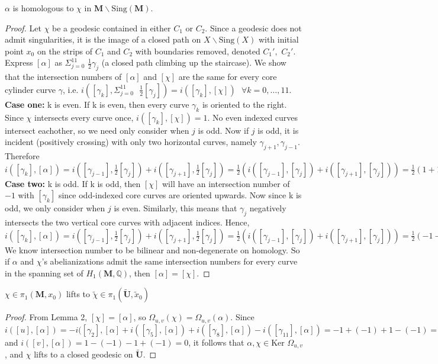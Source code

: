 \documentclass[]{article}
\begin{document}
\begin{lem}
$\alpha$ is homologous to $\chi$ in  $\mathbf{M}\backslash\text{Sing}(\mathbf{M})$.
\begin{proof}
Let $\chi$ be a geodesic contained in either $C_1$ or $C_2$. Since a geodesic does not admit singularities, it is the image of a closed path on $X\backslash\text{Sing}(X)$ with initial point $x_0$ on the strips of $C_1$ and $C_2$ with boundaries removed, denoted $C_1',$ $C_2'$. Express $[\alpha]$ as $\Sigma^{11}_{j=0}$ $\frac{1}{2}\gamma_j$ (a closed path climbing up the staircase). We show that the intersection numbers of $[\alpha]$ and $[\chi]$ are the same for every core cylinder curve $\gamma$, i.e. $i([\gamma_k], \Sigma^{11}_{j=0} \text{ } \frac{1}{2}[\gamma_j])=i([\gamma_k],[\chi])\text{ } \forall k=0,\dots,11$.\\
\textbf{Case one:} k is even. If k is even, then every curve $\gamma_k$ is oriented to the right. Since $\chi$ intersects every curve once, $i([\gamma_k],[\chi])=1$. No even indexed curves intersect eachother, so we need only consider when $j$ is odd. Now if $j$ is odd, it is incident (positively crossing) with only two horizontal curves, namely $\gamma_{j+1},\gamma_{j-1}$. Therefore $i([\gamma_k],[\alpha])=i([\gamma_{j-1}],\frac{1}{2}[\gamma_{j}])+i([\gamma_{j+1}],\frac{1}{2}[\gamma_{j}])=\frac{1}{2}(i([\gamma_{j-1}],[\gamma_{j}])+i([\gamma_{j+1}],[\gamma_{j}]))=\frac{1}{2}(1+1)=1.$\\
\textbf{Case two:} k is odd. If k is odd, then $[\chi]$ will have an intersection number of $-1$ with $[\gamma_k]$ since odd-indexed core curves are oriented upwards. Now since k is odd, we only consider when $j$ is even. Similarly, this means that $\gamma_j$ negatively intersects the two vertical core curves with adjacent indices. Hence, $i([\gamma_k],[\alpha])=i([\gamma_{j-1}],\frac{1}{2}[\gamma_{j}])+i([\gamma_{j+1}],\frac{1}{2}[\gamma_{j}])=\frac{1}{2}(i([\gamma_{j-1}],[\gamma_{j}])+i([\gamma_{j+1}],[\gamma_{j}]))=\frac{1}{2}(-1-1)=-1.$\\
We know intersection number to be bilinear and non-degenerate on homology. So if $\alpha$ and $\chi$'s abelianizations admit the same intersection numbers for every curve in the spanning set of $H_1(\mathbf{M}, \mathbb{Q})$, then $[\alpha]=[\chi]$.
\end{proof}
\end{lem}

\begin{thm}
$\chi\in\pi_1(\mathbf{M},x_0)$ lifts to $\tilde{\chi}\in\pi_1(\tilde{\mathbf{U}},\tilde{x}_0)$
\begin{proof}
From Lemma 2, $[\chi]=[\alpha]$, so $\Omega_{u,v}(\chi)=\Omega_{u,v}(\alpha)$. Since
$i([u],[\alpha])=-i([\gamma_2],[\alpha] +i([\gamma_5],[\alpha]) + i([\gamma_8],[\alpha]) - i([\gamma_{11}],[\alpha])=-1+(-1)+1-(-1)=0$ and $i([v],[\alpha])=1-(-1)-1+(-1)=0$, it follows that $\alpha,\chi\in\text{Ker }\Omega_{u,v}$, and $\chi$ lifts to a closed geodesic on $\tilde{\mathbf{U}}$.
\end{proof}
\end{thm}
\end{document}

